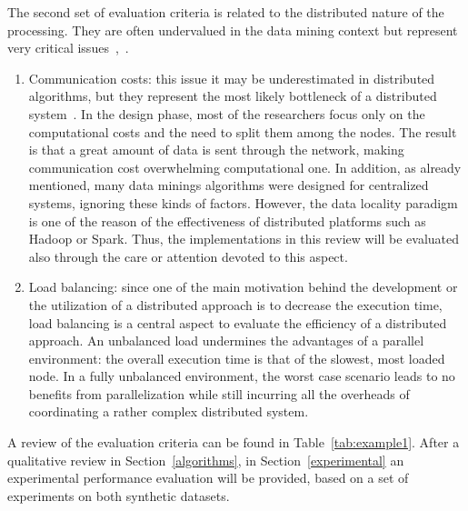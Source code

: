 The second set of evaluation criteria is related to the distributed nature of the processing. They are often undervalued in the data mining context but represent very critical issues~\cite{afrati2012designing},~\cite{leskovec2014mining}.
\begin{enumerate}
\item Communication costs: this issue it may be underestimated in distributed algorithms, but they represent the most likely bottleneck of a distributed system~\cite{sarma2013upper}. In the design phase, most of the researchers focus only on the computational costs and the need to split them among the nodes. The result is that a great amount of data is sent through the network, making communication cost overwhelming computational one. In addition, as already mentioned, many data minings algorithms were designed for centralized systems, ignoring these kinds of factors. However, the data locality paradigm is one of the reason of the effectiveness of distributed platforms such as Hadoop or Spark. Thus, the implementations in this review will be evaluated also through the care or attention devoted to this aspect.
\item Load balancing: since one of the main motivation behind the development or the utilization of a distributed approach is to decrease the execution time, load balancing is a central aspect to evaluate the efficiency of a distributed approach. An unbalanced load undermines the advantages of a parallel environment: the overall execution time is that of the slowest, most loaded node. In a fully unbalanced environment, the worst case scenario leads to no benefits from parallelization while still incurring all the overheads of coordinating a rather complex distributed system.
\end{enumerate}
A review of the evaluation criteria can be found in Table~\ref{tab:example1}. After a qualitative review in Section~\ref{algorithms}, in Section~\ref{experimental} an experimental performance evaluation will be provided, based on a set of experiments on both synthetic datasets.